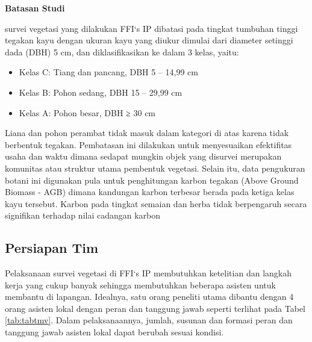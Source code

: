 \documentclass[
]{book}
\providecommand{\tightlist}{%
  \setlength{\itemsep}{0pt}\setlength{\parskip}{0pt}}
\begin{document}
\textbf{Batasan Studi}

survei vegetasi yang dilakukan FFI`s IP dibatasi pada tingkat tumbuhan tinggi tegakan kayu dengan ukuran kayu yang diukur dimulai dari diameter setinggi dada (DBH) 5 cm, dan diklasifikasikan ke dalam 3 kelas, yaitu:

\begin{itemize}
\tightlist
\item
  Kelas C: Tiang dan pancang, DBH 5 -- 14,99 cm
\item
  Kelas B: Pohon sedang, DBH 15 -- 29,99 cm
\item
  Kelas A: Pohon besar, DBH ≥ 30 cm
\end{itemize}

Liana dan pohon perambat tidak masuk dalam kategori di atas karena tidak berbentuk tegakan. Pembatasan ini dilakukan untuk menyesuaikan efektifitas usaha dan waktu dimana sedapat mungkin objek yang disurvei merupakan komunitas atau struktur utama pembentuk vegetasi. Selain itu, data pengukuran botani ini digunakan pula untuk penghitungan karbon tegakan (Above Ground Biomass - AGB) dimana kandungan karbon terbesar berada pada ketiga kelas kayu tersebut. Karbon pada tingkat semaian dan herba tidak berpengaruh secara signifikan terhadap nilai cadangan karbon

\hypertarget{persiapan-tim-3}{%
\subsection*{Persiapan Tim}\label{persiapan-tim-3}}

Pelaksanaan survei vegetasi di FFI`s IP membutuhkan ketelitian dan langkah kerja yang cukup banyak sehingga membutuhkan beberapa asisten untuk membantu di lapangan. Idealnya, satu orang peneliti utama dibantu dengan 4 orang asisten lokal dengan peran dan tanggung jawab seperti terlihat pada Tabel \ref{tab:tabtmv}. Dalam pelaksanaannya, jumlah, susunan dan formasi peran dan tanggung jawab asisten lokal dapat berubah sesuai kondisi.
\end{document}

